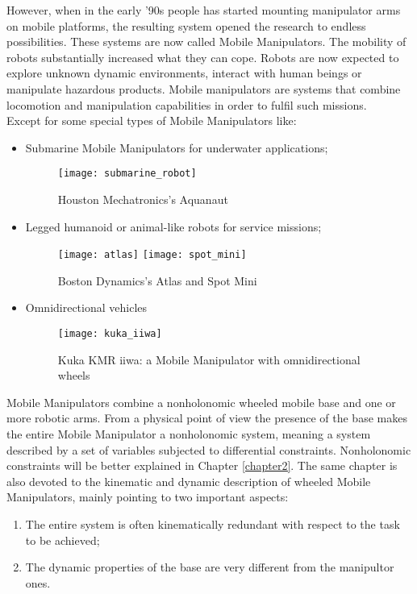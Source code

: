 However, when in the early '90s people has started mounting manipulator arms on mobile platforms, the resulting system opened the research to endless possibilities. These systems are now called Mobile Manipulators.
The mobility of robots substantially increased what they can cope. Robots are now expected to explore unknown dynamic environments, interact with human beings or manipulate hazardous products. Mobile manipulators are systems that combine locomotion and manipulation capabilities in order to fulfil such missions. \\
Except for some special types of Mobile Manipulators like:
\begin{itemize}
	\item Submarine Mobile Manipulators for underwater applications;\begin{figure}[h!]
		\centering
		\texttt{[image: submarine\_robot]}
		\caption{Houston Mechatronics's Aquanaut}
		\label{fig:aquanaut} 
	\end{figure}
	\item Legged humanoid or animal-like robots for service missions;\begin{figure}[h!]
		\centering 
		\texttt{[image: atlas]}
		\label{fig:atlas} 
		\quad
		\texttt{[image: spot\_mini]}
		\label{fig:spotmini} 
		\caption{Boston Dynamics's Atlas and Spot Mini}
	\end{figure}
	\item Omnidirectional vehicles \begin{figure}[h!]
		\centering
		\texttt{[image: kuka\_iiwa]}
		\caption{Kuka KMR iiwa: a Mobile Manipulator with omnidirectional wheels}
		\label{fig:iiwa} 
	\end{figure}
\end{itemize}
Mobile Manipulators combine a nonholonomic wheeled mobile base and one or more robotic arms. From a physical point of view the presence of the base makes the entire Mobile Manipulator a nonholonomic system, meaning a system described by a set of variables subjected to differential constraints. Nonholonomic constraints will be better explained in Chapter \ref{chapter2}. The same chapter is also devoted to the kinematic and dynamic description of wheeled Mobile Manipulators, mainly pointing to two important aspects:
\begin{enumerate}
	\item The entire system is often kinematically redundant with respect to the task to be achieved;
	\item The dynamic properties of the base are very different from the manipultor ones.
\end{enumerate}
